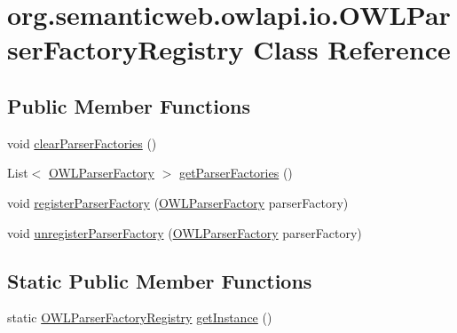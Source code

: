 \hypertarget{classorg_1_1semanticweb_1_1owlapi_1_1io_1_1_o_w_l_parser_factory_registry}{\section{org.\-semanticweb.\-owlapi.\-io.\-O\-W\-L\-Parser\-Factory\-Registry Class Reference}
\label{classorg_1_1semanticweb_1_1owlapi_1_1io_1_1_o_w_l_parser_factory_registry}
}
\subsection*{Public Member Functions}
\begin{DoxyCompactItemize}
\item 
void \hyperlink{classorg_1_1semanticweb_1_1owlapi_1_1io_1_1_o_w_l_parser_factory_registry_a86459f10e75be6b7da85123b07682abf}{clear\-Parser\-Factories} ()
\item 
List$<$ \hyperlink{interfaceorg_1_1semanticweb_1_1owlapi_1_1io_1_1_o_w_l_parser_factory}{O\-W\-L\-Parser\-Factory} $>$ \hyperlink{classorg_1_1semanticweb_1_1owlapi_1_1io_1_1_o_w_l_parser_factory_registry_ab183ce8ead232ee408c1de9ac7bfaffc}{get\-Parser\-Factories} ()
\item 
void \hyperlink{classorg_1_1semanticweb_1_1owlapi_1_1io_1_1_o_w_l_parser_factory_registry_a6dacdee19a77044ac0c4d668f61cf8ba}{register\-Parser\-Factory} (\hyperlink{interfaceorg_1_1semanticweb_1_1owlapi_1_1io_1_1_o_w_l_parser_factory}{O\-W\-L\-Parser\-Factory} parser\-Factory)
\item 
void \hyperlink{classorg_1_1semanticweb_1_1owlapi_1_1io_1_1_o_w_l_parser_factory_registry_a1450bc536f49a3e44bdb897c6f971bc4}{unregister\-Parser\-Factory} (\hyperlink{interfaceorg_1_1semanticweb_1_1owlapi_1_1io_1_1_o_w_l_parser_factory}{O\-W\-L\-Parser\-Factory} parser\-Factory)
\end{DoxyCompactItemize}
\subsection*{Static Public Member Functions}
\begin{DoxyCompactItemize}
\item 
static \hyperlink{classorg_1_1semanticweb_1_1owlapi_1_1io_1_1_o_w_l_parser_factory_registry}{O\-W\-L\-Parser\-Factory\-Registry} \hyperlink{classorg_1_1semanticweb_1_1owlapi_1_1io_1_1_o_w_l_parser_factory_registry_ac1cbcd43b9690660e7aed895d1b67e49}{get\-Instance} ()
\end{DoxyCompactItemize}
